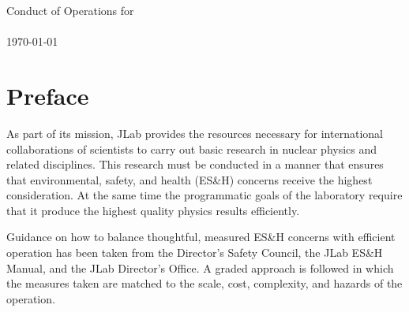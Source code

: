 \documentclass[11pt]{article}
\begin{document}
% 
%                       
%
%
%
%
%
%
%


\begin{center}
\Large 
Conduct of Operations for \HALL\ \\
\EXPTS \\ 
\today 
  
\end{center}
\normalsize

\tableofcontents


\newpage

\section{Preface}
\indent

As part of its mission, JLab provides the resources necessary for international
collaborations of scientists to carry out basic research in nuclear physics 
and related disciplines. This research must be conducted
in a manner that ensures that environmental, safety, and health (ES\&H) 
concerns receive the highest consideration. At the same time the programmatic 
goals of the laboratory require that it produce the highest quality physics 
results efficiently.

Guidance on how to balance thoughtful, measured ES\&H concerns with efficient
operation has been taken from 
the Director's Safety Council, the JLab ES\&H Manual, and the
JLab Director's Office. A graded approach is followed in which the measures 
taken are matched to the scale, cost, complexity, and hazards of the operation.
\end{document}
